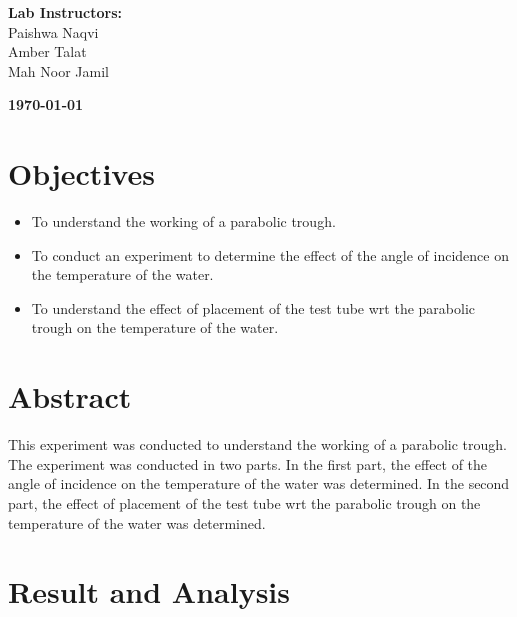 \documentclass[a4paper, 12pt, english]{article}
\begin{document}
\begin{titlepage}
\begin{center}
		\vspace{45pt}
		\textbf {\large Lab Instructors:}\\[0.2cm]
		\Large {Paishwa Naqvi}\\[0.1cm]
		\Large {Amber Talat}\\[0.1cm]
		\Large {Mah Noor Jamil}\\[0.1cm]
	\end{center}

	\par
	\vfill
	\begin{center}
		\textbf{\today}\\
	\end{center}

\end{titlepage}



\newpage
\section{Objectives}
\begin{itemize}
	\item To understand the working of a parabolic trough.
	\item To conduct an experiment to determine the effect of the angle of incidence on
	      the temperature of the water.
	\item To understand the effect of placement of the test tube wrt the parabolic trough
	      on the temperature of the water.
\end{itemize}

\section{Abstract}
This experiment was conducted to understand the working of a parabolic trough.
The experiment was conducted in two parts. In the first part, the effect of the
angle of incidence on the temperature of the water was determined. In the
second part, the effect of placement of the test tube wrt the parabolic trough
on the temperature of the water was determined.
\section{Result and Analysis}
\end{document}
